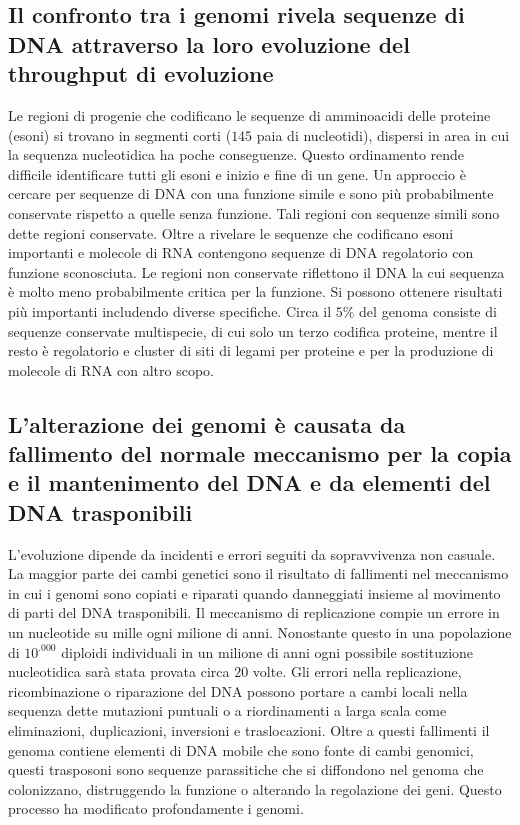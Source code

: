 \subsection{Il confronto tra i genomi rivela sequenze di DNA attraverso la loro evoluzione del throughput di evoluzione}
Le regioni di progenie che codificano le sequenze di amminoacidi delle proteine (esoni) si trovano in segmenti corti ($145$ paia di nucleotidi), dispersi in area in cui la sequenza 
nucleotidica ha poche conseguenze. Questo ordinamento rende difficile identificare tutti gli esoni e inizio e fine di un gene. Un approccio \`e cercare per sequenze di DNA con una 
funzione simile e sono pi\`u probabilmente conservate rispetto a quelle senza funzione. Tali regioni con sequenze simili sono dette regioni conservate. Oltre a rivelare le sequenze che
codificano esoni importanti e molecole di RNA contengono sequenze di DNA regolatorio con funzione sconosciuta. Le regioni non conservate riflettono il DNA la cui sequenza \`e molto 
meno probabilmente critica per la funzione. Si possono ottenere risultati pi\`u importanti includendo diverse specifiche. Circa il $5\%$ del genoma consiste di sequenze conservate 
multispecie, di cui solo un terzo codifica proteine, mentre il resto \`e regolatorio e cluster di siti di legami per proteine e per la produzione di molecole di RNA con altro scopo. 
\subsection{L'alterazione dei genomi \`e causata da fallimento del normale meccanismo per la copia e il mantenimento del DNA e da elementi del DNA trasponibili}
L'evoluzione dipende da incidenti e errori seguiti da sopravvivenza non casuale. La maggior parte dei cambi genetici sono il risultato di fallimenti nel meccanismo in cui i genomi
sono copiati e riparati quando danneggiati insieme al movimento di parti del DNA trasponibili. Il meccanismo di replicazione compie un errore in un nucleotide su mille ogni milione di
anni. Nonostante questo in una popolazione di $10^.000$ diploidi individuali in un milione di anni ogni possibile sostituzione nucleotidica sar\`a stata provata circa $20$ volte. Gli
errori nella replicazione, ricombinazione o riparazione del DNA possono portare a cambi locali nella sequenza dette mutazioni puntuali o a riordinamenti a larga scala come eliminazioni, 
duplicazioni, inversioni e traslocazioni. Oltre a questi fallimenti il genoma contiene elementi di DNA mobile che sono fonte di cambi genomici, questi trasposoni sono sequenze 
parassitiche che si diffondono nel genoma che colonizzano, distruggendo la funzione o alterando la regolazione dei geni. Questo processo ha modificato profondamente i genomi.
